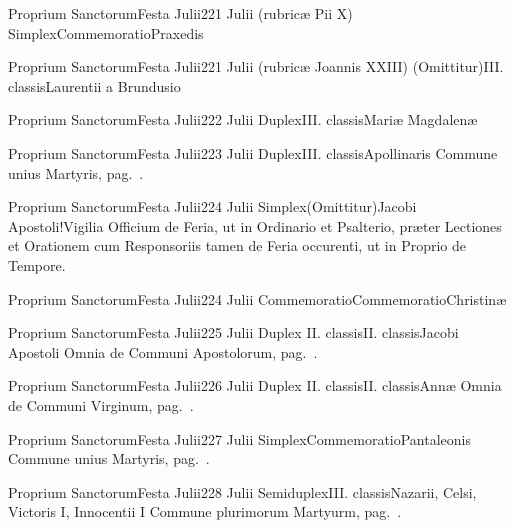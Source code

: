 \documentclass[liber-responsorialis.tex]{subfiles}
\begin{document}
	{Proprium Sanctorum}{Festa Julii}{2}{21 Julii (rubricæ Pii X)}
	{Simplex}{Commemoratio}{Praxedis}
	{}
	{}
\rubric{\respdetemp}

	{Proprium Sanctorum}{Festa Julii}{2}{21 Julii (rubricæ Joannis XXIII)}
	{(Omittitur)}{III. classis}{Laurentii a Brundusio}
	{}
	{}
\rubric{\respdetemp}

	{Proprium Sanctorum}{Festa Julii}{2}{22 Julii}
	{Duplex}{III. classis}{Mariæ Magdalenæ}
	{}
	{}


	{Proprium Sanctorum}{Festa Julii}{2}{23 Julii}
	{Duplex}{III. classis}{Apollinaris}
	{Commune unius Martyris, pag.\ \pageref{M-UMEX}.}
	{}

	{Proprium Sanctorum}{Festa Julii}{2}{24 Julii}
	{Simplex}{(Omittitur)}{Jacobi Apostoli!Vigilia}
	{Officium de Feria, ut in Ordinario et Psalterio, præter Lectiones et Orationem cum Responsoriis tamen de Feria occurenti, ut in Proprio de Tempore.}
	{}

	{Proprium Sanctorum}{Festa Julii}{2}{24 Julii}
	{Commemoratio}{Commemoratio}{Christinæ}
	{}
	{}

	{Proprium Sanctorum}{Festa Julii}{2}{25 Julii}
	{Duplex II. classis}{II. classis}{Jacobi Apostoli}
	{Omnia de Communi Apostolorum, pag.\ \pageref{M-APEX}.}
	{}

	{Proprium Sanctorum}{Festa Julii}{2}{26 Julii}
	{Duplex II. classis}{II. classis}{Annæ}
	{Omnia de Communi Virginum, pag.\ \pageref{M-MU}.}
	{}

	{Proprium Sanctorum}{Festa Julii}{2}{27 Julii}
	{Simplex}{Commemoratio}{Pantaleonis}
	{Commune unius Martyris, pag.\ \pageref{M-UMEX}.}
	{}

	{Proprium Sanctorum}{Festa Julii}{2}{28 Julii}
	{Semiduplex}{III. classis}{Nazarii, Celsi, Victoris I, Innocentii I}
	{Commune plurimorum Martyurm, pag.\ \pageref{M-PMEX}.}
	{}
\end{document}

